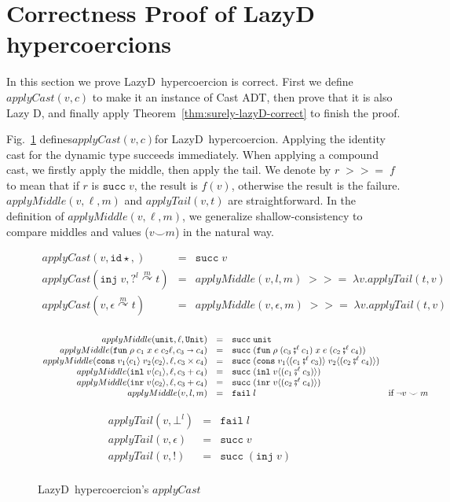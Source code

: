 \documentclass[acmsmall,review,anonymous]{acmart}\settopmatter{printfolios=true,printccs=false,printacmref=false}
\newcommand{\figref}[1]{Fig.~\ref{#1}}
\newcommand{\funrule}[3]{#1 &=& #2 & #3\\}
\newcommand{\plus}[0]{+}
\newcommand{\lazyD}{Lazy\;D}
\newcommand{\POOunit}[0]{\mathtt{Unit}}
\newcommand{\POOfun}[2]{#1 \shortrightarrow #2}
\newcommand{\POOprod}[2]{#1 \times #2}
\newcommand{\POOsum}[2]{#1 \plus #2}
\newcommand{\rOOsucc}[1]{\mathtt{succ}\;#1}
\newcommand{\rOOfail}[1]{\mathtt{fail}\;#1}
\newcommand{\hcvOOinj}[2]{\mathtt{inj} \; #2}
\newcommand{\hcvOOfun}[5]{\mathtt{fun} \; #2 \; #1 \; #3 \; #4 \; #5}
\newcommand{\hcvOOtt}[0]{\mathtt{unit}}
\newcommand{\hcvOOcons}[4]{\mathtt{cons}\;#1\langle#2\rangle\;#3\langle#4\rangle}
\newcommand{\hcvOOinl}[2]{\mathtt{inl}\;#1\langle#2\rangle}
\newcommand{\hcvOOinr}[2]{\mathtt{inr}\;#1\langle#2\rangle}
\newcommand{\sidecond}[1]{\text{if}\;#1}
\newcommand{\hyperCoercionI}[0]{\mathtt{id\star}}
\newcommand{\hyperCoercionC}[3]{#1 \overset{#2}{\curvearrowright} #3}
\begin{document}
\section{Correctness Proof of \lazyD{} hypercoercions}
\label{sec:hypercoercion-correctness}

In this section we prove \lazyD\ hypercoercion is 
correct. First we define$applyCast(v,c)$ to make it an instance of Cast ADT, 
then prove that it is also Lazy D, and finally apply 
Theorem~\ref{thm:surely-lazyD-correct} to finish the proof.

\figref{hc-applyCast} defines$applyCast(v,c)$for \lazyD\ hypercoercion. 
Applying the identity cast for the 
dynamic type succeeds immediately. When applying a compound cast, we firstly 
apply the middle, then apply the tail. We denote by $r \; >>= \; f$ to mean 
that if $r$ is $\rOOsucc{v}$, the result is $f(v)$, otherwise the result 
is the failure.
$ applyMiddle(v,\ell,m)$ and $applyTail(v,t)$ are straightforward.
In the definition of $applyMiddle(v,\ell,m)$, we generalize 
shallow-consistency to compare middles and values ($v \smile m$) in the 
natural way.

\begin{figure}
	\[
	\begin{array}{rclr}
	\funrule{applyCast(v,\hyperCoercionI,)}{\rOOsucc{v}}{}
	\funrule{applyCast(\hcvOOinj{P}{v},\hyperCoercionC{?^l}{m}{t})}{
		applyMiddle(v,l,m) \; >>= \; \lambda v. applyTail(t,v)
	}{}
	\funrule{applyCast(v,\hyperCoercionC{\epsilon}{m}{t})}{
		applyMiddle(v,\epsilon,m) \; >>= \; \lambda v. applyTail(t,v)
	}{}
	\end{array}
	\]
	
	\[
	\begin{array}{rclr}
	\funrule{applyMiddle(\hcvOOtt,\ell,\POOunit)}{\rOOsucc{\hcvOOtt}}{}
	\funrule{applyMiddle(\hcvOOfun{c_1}{\rho}{x}{e}{c_2}\ell,\POOfun{c_3}{c_4})}{
		\rOOsucc{(\hcvOOfun{(c_3 \fatsemi^\ell c_1)}{\rho}{x}{e}{(c_2 
		\fatsemi^\ell c_4)})}
	}{}
	\funrule{applyMiddle(\hcvOOcons{v_1}{c_1}{v_2}{c_2},\ell,\POOprod{c_3}{c_4})}{
		\rOOsucc{(\hcvOOcons{v_1}{(c_1 \fatsemi^\ell c_3)}{v_2}{(c_2 
		\fatsemi^\ell c_4)})}
	}{}
	\funrule{applyMiddle(\hcvOOinl{v}{c_1},\ell,\POOsum{c_3}{c_4})}{
		\rOOsucc{(\hcvOOinl{v}{(c_1 \fatsemi^\ell c_3)})}
	}{}
	\funrule{applyMiddle(\hcvOOinr{v}{c_2},\ell,\POOsum{c_3}{c_4})}{
		\rOOsucc{(\hcvOOinr{v}{(c_2 \fatsemi^\ell c_4)})}
	}{}
	\funrule{applyMiddle(v,l,m)}{
		\rOOfail{l}
	}{
		\sidecond{\neg v \smile m}
	}
	\end{array}
	\]
	
	\[
	\begin{array}{rclr}
	\funrule{applyTail(v,\bot^l)}{\rOOfail{l}}{}
	\funrule{applyTail(v,\epsilon)}{\rOOsucc{v}}{}
	\funrule{applyTail(v,!)}{\rOOsucc{(\hcvOOinj{P}{v})}}{}
	\end{array}
	\]
	\caption{\lazyD\ hypercoercion's $applyCast$}
	\label{hc-applyCast}
\end{figure}
\end{document}
